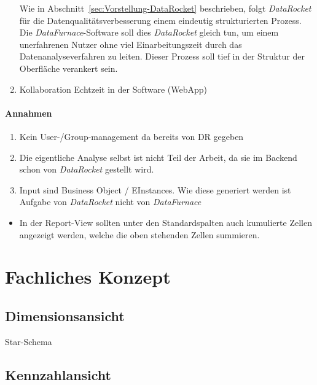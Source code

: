 \documentclass[
  language=german, %
  type=bachelor%
]{isthesis}
\begin{document}
\begin{content}
\begin{enumerate}
      Wie in Abschnitt~\ref{sec:Vorstellung-DataRocket} beschrieben, folgt
      \textit{DataRocket} für die Datenqualitätsverbesserung einem eindeutig
      strukturierten Prozess. Die \textit{DataFurnace}-Software soll dies
      \textit{DataRocket} gleich tun, um einem unerfahrenen Nutzer ohne viel
      Einarbeitungszeit durch das Datenanalyseverfahren zu leiten. Dieser
      Prozess soll tief in der Struktur der Oberfläche verankert sein.

    \item Kollaboration Echtzeit in der Software (WebApp)
      
  \end{enumerate}
  \paragraph{Annahmen}
  \begin{enumerate}
    \item Kein User-/Group-management da bereits von DR gegeben
    \item Die eigentliche Analyse selbst ist nicht Teil der Arbeit, da sie im
      Backend schon von \textit{DataRocket} gestellt wird.
    \item Input sind Business Object / EInstances. Wie diese generiert werden
      ist Aufgabe von \textit{DataRocket} nicht von \textit{DataFurnace}
  \end{enumerate}
  

  \begin{itemize}
    \item In der Report-View sollten unter den Standardspalten auch kumulierte
      Zellen angezeigt werden, welche die oben stehenden Zellen summieren.
  \end{itemize}

  \section{Fachliches Konzept}
  \subsection{Dimensionsansicht}
  Star-Schema
  \subsection{Kennzahlansicht}

\end{content}
\end{document}
